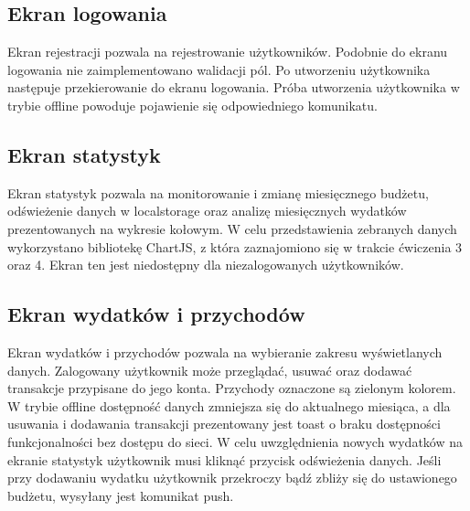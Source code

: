 \documentclass[11pt,titlepage]{article}
\begin{document}
\subsection{Ekran logowania}
Ekran rejestracji pozwala na rejestrowanie użytkowników. Podobnie do ekranu logowania nie zaimplementowano walidacji pól. Po utworzeniu użytkownika następuje przekierowanie do ekranu logowania. Próba utworzenia użytkownika w trybie offline powoduje pojawienie się odpowiedniego komunikatu.

\subsection{Ekran statystyk}
Ekran statystyk pozwala na monitorowanie i zmianę miesięcznego budżetu, odświeżenie danych w localstorage oraz analizę miesięcznych wydatków prezentowanych na wykresie kołowym. W celu przedstawienia zebranych danych wykorzystano bibliotekę ChartJS, z która zaznajomiono się w trakcie ćwiczenia 3 oraz 4. Ekran ten jest niedostępny dla niezalogowanych użytkowników.

\subsection{Ekran wydatków i przychodów}
Ekran wydatków i przychodów pozwala na wybieranie zakresu wyświetlanych danych. Zalogowany użytkownik może przeglądać, usuwać oraz dodawać transakcje przypisane do jego konta. Przychody oznaczone są zielonym kolorem. W trybie offline dostępność danych zmniejsza się do aktualnego miesiąca, a dla usuwania i dodawania transakcji prezentowany jest toast o braku dostępności funkcjonalności bez dostępu do sieci. W celu uwzględnienia nowych wydatków na ekranie statystyk użytkownik musi kliknąć przycisk odświeżenia danych. Jeśli przy dodawaniu wydatku użytkownik przekroczy bądź zbliży się do ustawionego budżetu, wysyłany jest komunikat push.
\end{document}
